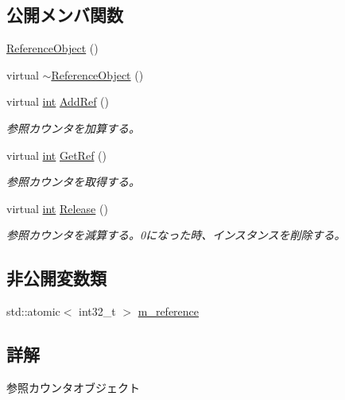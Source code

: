 \subsection*{公開メンバ関数}
\begin{DoxyCompactItemize}
\item 
\mbox{\hyperlink{class_effekseer_1_1_reference_object_a8754e7232ae958c9e5b0d85f83ce7c3a}{Reference\+Object}} ()
\item 
virtual \mbox{\hyperlink{class_effekseer_1_1_reference_object_a41396f9ecf1d190e4768b134a0c19e26}{$\sim$\+Reference\+Object}} ()
\item 
virtual \mbox{\hyperlink{namespace_effekseer_ace0abf7c2e6947e519ebe8b54cbcc30a}{int}} \mbox{\hyperlink{class_effekseer_1_1_reference_object_a1cc3feeee39b72aea152ed223dbd0fa7}{Add\+Ref}} ()
\begin{DoxyCompactList}\small\item\em 参照カウンタを加算する。 \end{DoxyCompactList}\item 
virtual \mbox{\hyperlink{namespace_effekseer_ace0abf7c2e6947e519ebe8b54cbcc30a}{int}} \mbox{\hyperlink{class_effekseer_1_1_reference_object_a4b8c3d79c58ca527850733691053cf5a}{Get\+Ref}} ()
\begin{DoxyCompactList}\small\item\em 参照カウンタを取得する。 \end{DoxyCompactList}\item 
virtual \mbox{\hyperlink{namespace_effekseer_ace0abf7c2e6947e519ebe8b54cbcc30a}{int}} \mbox{\hyperlink{class_effekseer_1_1_reference_object_a6b0e9aa4d994b557d499b15359b580d8}{Release}} ()
\begin{DoxyCompactList}\small\item\em 参照カウンタを減算する。0になった時、インスタンスを削除する。 \end{DoxyCompactList}\end{DoxyCompactItemize}
\subsection*{非公開変数類}
\begin{DoxyCompactItemize}
\item 
std\+::atomic$<$ int32\+\_\+t $>$ \mbox{\hyperlink{class_effekseer_1_1_reference_object_a916a836400f9a2876ec6f0e0a0003aa7}{m\+\_\+reference}}
\end{DoxyCompactItemize}


\subsection{詳解}
参照カウンタオブジェクト 

